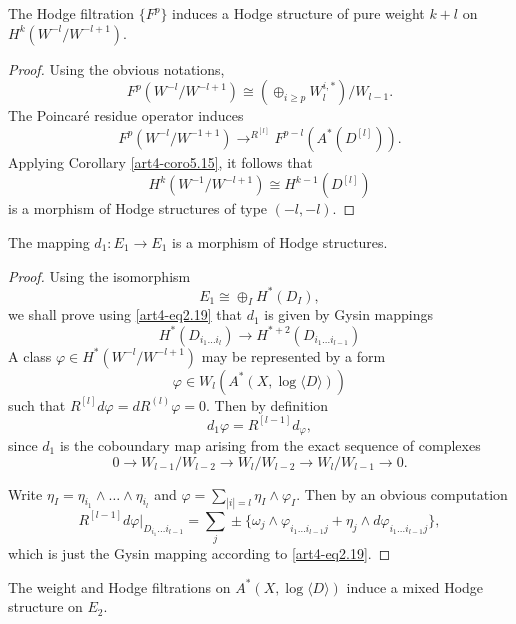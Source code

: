\begin{lemma}\label{art4-lem5.20}
The Hodge filtration $\{F^p\}$ induces a Hodge structure of pure weight $k+l$ on $H^k (W^{-l} / W^{-l+1})$.
\end{lemma}

\begin{proof}
Using the obvious notations,
$$
F^p (W^{-l} / W^{-l+1}) \cong (\oplus_{i\geqslant p} W^{i,\ast}_l)/ W_{l-1}.
$$
The Poincar\'e residue operator induces
$$
F^p (W^{-l}/ W^{-1+1}) {\displaystyle{\mathop{\longrightarrow}^{R^{[l]}}}} F^{p-l} (A^{\ast} (D^{[l]})).
$$
Applying Corollary \ref{art4-coro5.15}, it follows that 
$$
H^k (W^{-1}/ W^{-l+1}) \cong H^{k-1} (D^{[l]})
$$
is a morphism of Hodge structures of type $(-l, -l)$.
\end{proof}

\begin{lemma}\label{art4-lem5.21}
The mapping $d_1 : E_1 \to E_1$ is a morphism of Hodge structures.
\end{lemma}

\begin{proof}
Using the isomorphism
$$
E_1 \cong \oplus_I H^\ast (D_I), 
$$
we shall prove using \eqref{art4-eq2.19} that $d_1$ is given by Gysin mappings 
$$
H^\ast (D_{i_1\ldots i_l}) \to H^{\ast+2} (D_{i_1 \ldots i_{l-1}})
$$
A class $\varphi \in H^\ast (W^{-l}/ W^{-l+1})$ may be represented by a form 
$$
\varphi \in W_l (A^\ast (X, \log \langle D \rangle))
$$
such that $R^{[l]} d \varphi = d R^{(l)} \varphi =0$. Then by definition
$$
d_1 \varphi = R^{[l-1]} d_\varphi,
$$\pageoriginale
since $d_1$ is the coboundary map arising from the exact sequence of complexes
$$
0 \to W_{l-1}/ W_{l-2} \to W_l /W_{l-2} \to W_l / W_{l-1} \to 0.
$$

Write $\eta_I = \eta_{i_1} \wedge \ldots \wedge \eta_{i_l}$ and $\varphi =\sum\limits_{|i| =l} \eta_I \wedge \varphi_I$. Then by an obvious computation
$$
R^{[l-1]} d \varphi|_{D_{i_1} \ldots i_{l-1}} = \sum\limits_{j} \pm \{\omega_j \wedge \varphi_{i_1 \ldots i_{l - 1} j} + \eta_j \wedge d \varphi_{i_1 \ldots i_{l-1} j}\},
$$
which is just the Gysin mapping according to \eqref{art4-eq2.19}.
\end{proof}

\begin{coro}\label{art4-coro5.22}
The weight and Hodge filtrations on $A^\ast (X, \log \langle D \rangle)$ induce a mixed Hodge structure on $E_2$.
\end{coro}

